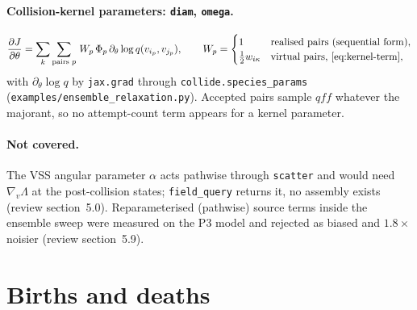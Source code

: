 \documentclass[11pt,a4paper]{article}
\numberwithin{equation}{section}
\newcommand{\code}[1]{\texttt{#1}}
\newcommand{\Lam}{\Lambda}
\begin{document}
\paragraph{Collision-kernel parameters: \code{diam}, \code{omega}.}
\begin{equation}
\label{eq:kernel-gradient}
\frac{\partial J}{\partial \theta} = \sum_k \sum_{\text{pairs } p}\, W_p\, \Phi_p\, \partial_\theta \log q(v_{i_p}, v_{j_p}),
\qquad
W_p = \begin{cases} 1 & \text{realised pairs (sequential form)},\\ \tfrac12 w_{i\kappa} & \text{virtual pairs, \eqref{eq:kernel-term}},\end{cases}
\end{equation}
with $\partial_\theta \log q$ by \code{jax.grad} through \code{collide.species\_params}
(\code{examples/ensemble\_relaxation.py}).  Accepted pairs sample $q f f$ whatever the
majorant, so no attempt-count term appears for a kernel parameter.

\paragraph{Not covered.}
The VSS angular parameter $\alpha$ acts pathwise through \code{scatter} and would need
$\nabla_v\Lam$ at the post-collision states; \code{field\_query} returns it, no assembly
exists (review section~5.0).  Reparameterised (pathwise) source terms inside the
ensemble sweep were measured on the P3 model and rejected as biased and $1.8\times$
noisier (review section~5.9).

\section{Births and deaths}
\label{sec:births}
\end{document}

